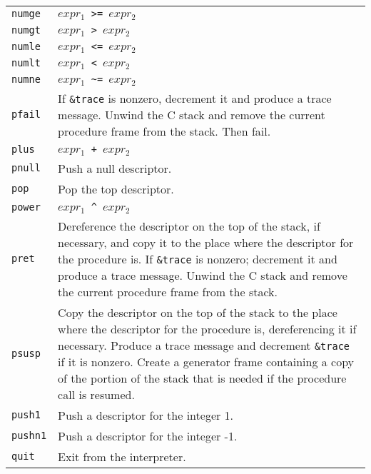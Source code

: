 \begin{xtabular}{l@{\hspace{1.5cm}}p{13.5cm}}
\texttt{numge}   & \texttt{$expr_1$ >= $expr_2$}\\

\texttt{numgt}   & \texttt{$expr_1$ > $expr_2$}\\

\texttt{numle}   & \texttt{$expr_1$ <= $expr_2$}\\

\texttt{numlt}   & \texttt{$expr_1$ < $expr_2$}\\

\texttt{numne}   & \texttt{$expr_1$ \textasciitilde= $expr_2$}\\

\texttt{pfail}   & If \texttt{\&trace} is nonzero, decrement it and produce a trace
message. Unwind the C stack and remove the current procedure frame
from the stack. Then fail.\\

\texttt{plus}    & \texttt{$expr_1$ + $expr_2$}\\

\texttt{pnull}   & Push a null descriptor.\\

\texttt{pop}     & Pop the top descriptor.\\

\texttt{power}   & \texttt{$expr_1$ \textasciicircum\ $expr_2$}\\

\texttt{pret}    & Dereference the descriptor on the top of the stack, if
necessary, and copy it to the place where the descriptor for the
procedure is. If \texttt{\&trace} is nonzero; decrement it and produce a trace
message. Unwind the C stack and remove the current procedure frame
from the stack.\\

\texttt{psusp}   & Copy the descriptor on the top of the stack to the place
where the descriptor for the procedure is, dereferencing it if
necessary. Produce a trace message and decrement \texttt{\&trace} if it is
nonzero. Create a generator frame containing a copy of the portion of
the stack that is needed if the procedure call is resumed.\\

\texttt{push1}   & Push a descriptor for the integer 1.\\

\texttt{pushn1}  & Push a descriptor for the integer -1.\\

\texttt{quit}    & Exit from the interpreter.\\


\end{xtabular}
